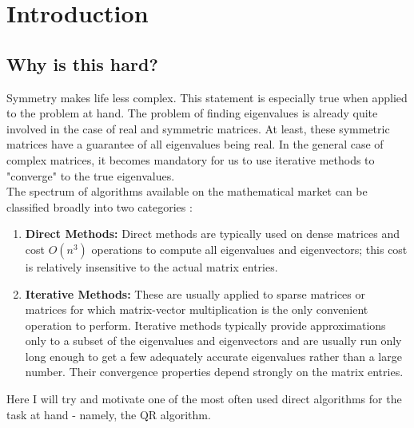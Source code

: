 
\chapter{Introduction} %

\label{Chapter1}



\section{Why is this hard?}
    Symmetry makes life less complex. This statement is especially true when applied to the problem at hand. The problem of finding eigenvalues is already quite involved in the case of real and symmetric matrices. At least, these symmetric matrices have a guarantee of all eigenvalues being real. In the general case of complex matrices, it becomes mandatory for us to use iterative methods to "converge" to the true eigenvalues.
    \\
    The spectrum of algorithms available on the mathematical market can be classified broadly into two categories :
    \begin{enumerate}
        \item \textbf{Direct Methods:} Direct methods are typically used on dense matrices and cost
$O(n^3)$ operations to compute all eigenvalues and eigenvectors; this cost is relatively insensitive to the actual matrix entries.
        \item \textbf{Iterative Methods: }
         These are usually applied
to sparse matrices or matrices for which matrix-vector multiplication is the
only convenient operation to perform. Iterative methods typically provide
approximations only to a subset of the eigenvalues and eigenvectors and are
usually run only long enough to get a few adequately accurate eigenvalues
rather than a large number. Their convergence properties depend strongly on
the matrix entries.
    \end{enumerate}
    Here I will try and motivate one of the most often used direct algorithms for the task at hand - namely, the QR algorithm.

